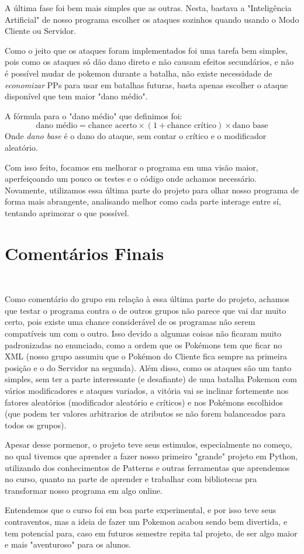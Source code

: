 \documentclass[a4paper]{article}
\begin{document}
A última fase foi bem mais simples que as outras. Nesta, bastava a "Inteligência Artificial"
de nosso programa escolher os ataques sozinhos quando usando o Modo Cliente ou Servidor.

Como o jeito que os ataques foram implementados foi uma tarefa bem simples, pois como os
ataques só dão dano direto e não causam efeitos secundários, e não é possível mudar de
pokemon durante a batalha, não existe necessidade de \emph{economizar} PPs para usar
em batalhas futuras, basta apenas escolher o ataque disponível que tem maior "dano médio".

A fórmula para o "dano médio" que definimos foi:
$$ \text{dano médio} = \text{chance acerto} \times (1 + \text{chance crítico}) \times \text{dano base} $$
Onde \emph{dano base} é o dano do ataque, sem contar o crítico e o modificador aleatório.

Com isso feito, focamos em melhorar o programa em uma visão maior, aperfeiçoando um pouco
os testes e o código onde achamos necessário. Novamente, utilizamos essa última parte do
projeto para olhar nosso programa de forma mais abrangente, analisando melhor como cada parte
interage entre sí, tentando aprimorar o que possível.

\newpage
\section{Comentários Finais}

\begin{verbatim}


\end{verbatim}

Como comentário do grupo em relação à essa última parte do projeto, achamos que testar o programa
contra o de outros grupos não parece que vai dar muito certo, pois existe uma chance considerável
de os programas não serem compatíveis um com o outro. Isso devido a algumas coisas não ficaram muito
padronizadas no enunciado, como a ordem que os Pokémons tem que ficar no XML (nosso grupo assumiu
que o Pokémon do Cliente fica sempre na primeira posição e o do Servidor na segunda).
Além disso, como os ataques são um tanto simples, sem ter a parte interessante (e desafiante) de uma
batalha Pokemon com vários modificadores e ataques variados, a vitória vai se inclinar fortemente
nos fatores aleatórios (modificador aleatório e críticos) e nos Pokémons escolhidos (que podem
ter valores arbitrarios de atributos se não forem balanceados para todos os grupos).

Apesar desse pormenor, o projeto teve seus estimulos, especialmente no começo, no qual tivemos que
aprender a fazer nosso primeiro "grande" projeto em Python, utilizando dos conhecimentos de Patterns
e outras ferramentas que aprendemos no curso, quanto na parte de aprender e trabalhar com bibliotecas
pra transformar nosso programa em algo online.

Entendemos que o curso foi em boa parte experimental, e por isso teve seus contraventos, mas a ideia
de fazer um Pokemon acabou sendo bem divertida, e tem potencial para, caso em futuros semestre repita
tal projeto, de ser algo maior e mais "aventuroso" para os alunos. 
\end{document}
